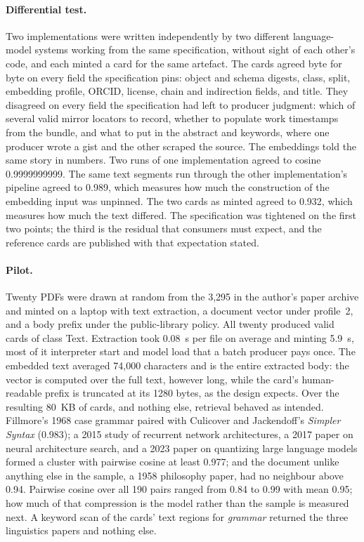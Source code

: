 \documentclass[sigconf]{acmart}
\begin{document}
\paragraph{Differential test.} Two implementations were written independently
by two different language-model systems working from the same specification,
without sight of each other's code, and each minted a card for the same
artefact. The cards agreed byte for byte on every field the specification
pins: object and schema digests, class, split, embedding profile, ORCID,
license, chain and indirection fields, and title. They disagreed on every field
the specification had left to producer judgment: which of several valid mirror
locators to record, whether to populate work timestamps from the bundle, and
what to put in the abstract and keywords, where one producer wrote a gist and
the other scraped the source. The embeddings told the same story in numbers.
Two runs of one implementation agreed to cosine 0.9999999999. The same text
segments run through the other implementation's pipeline agreed to 0.989,
which measures how much the construction of the embedding input was unpinned.
The two cards as minted agreed to 0.932, which measures how much the text
differed. The specification was tightened on the first two points; the third
is the residual that consumers must expect, and the reference cards are
published with that expectation stated.

\paragraph{Pilot.} Twenty PDFs were drawn at
random from the 3,295 in the author's paper archive and minted on a laptop with text
extraction, a document vector under profile~2, and a body prefix under the
public-library policy. All twenty produced valid cards of class Text.
Extraction took 0.08~s per file on average and minting 5.9~s, most of it
interpreter start and model load that a batch producer pays once. The embedded
text averaged 74,000 characters and is the entire extracted body: the vector
is computed over the full text, however long, while the card's human-readable
prefix is truncated at its 1280 bytes, as the design expects. Over the
resulting 80~KB of cards, and nothing else, retrieval behaved as intended.
Fillmore's 1968 case grammar paired with Culicover and Jackendoff's
\emph{Simpler Syntax} (0.983); a 2015 study of recurrent network
architectures, a 2017 paper on neural architecture search, and a 2023 paper on
quantizing large language models formed a cluster with pairwise cosine at
least 0.977; and the document unlike anything else in the sample, a 1958
philosophy paper, had no neighbour above 0.94. Pairwise cosine over all 190
pairs ranged from 0.84 to 0.99 with mean 0.95; how much of that compression
is the model rather than the sample is measured next. A keyword scan of the
cards' text regions for \emph{grammar} returned the three linguistics papers
and nothing else.
\end{document}
